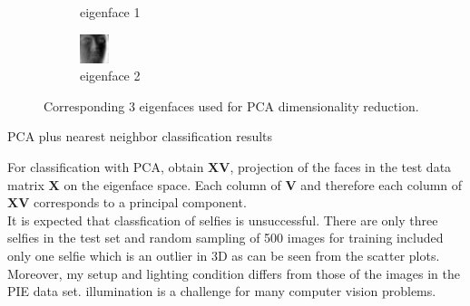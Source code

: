 \documentclass[a4paper]{exam}
\begin{document}
\begin{questions}
\begin{figure}[ht]
\begin{subfigure}[b]{0.3\textwidth}
            \caption{eigenface 1}
            \label{fig:eigenface1}
        \end{subfigure}
        \hfill
        \begin{subfigure}[b]{0.3\textwidth}
            \centering
            \includegraphics[width=\textwidth]{eigenface2}
            \caption{eigenface 2}
            \label{fig:eigenface2}
        \end{subfigure}
        \caption{Corresponding 3 eigenfaces used for PCA dimensionality reduction.}
        \label{fig:eigenface}
    \end{figure}

    \clearpage\question PCA plus nearest neighbor classification results

    For classification with PCA, obtain $\mathbf{XV}$, projection of the faces in the test data matrix $\mathbf{X}$ on the
    eigenface space. Each column of $\mathbf{V}$ and therefore each column of $\mathbf{XV}$ corresponds to a principal component.\\

    It is expected that classfication of selfies is unsuccessful. There are only three selfies in the test
    set and random sampling of 500 images for training included only one selfie which is an outlier in 3D as can be seen from the scatter plots.
    Moreover, my setup and lighting condition differs from those of the images in the PIE data set.
    illumination is a challenge for many computer vision problems.


\end{questions}
\end{document}
